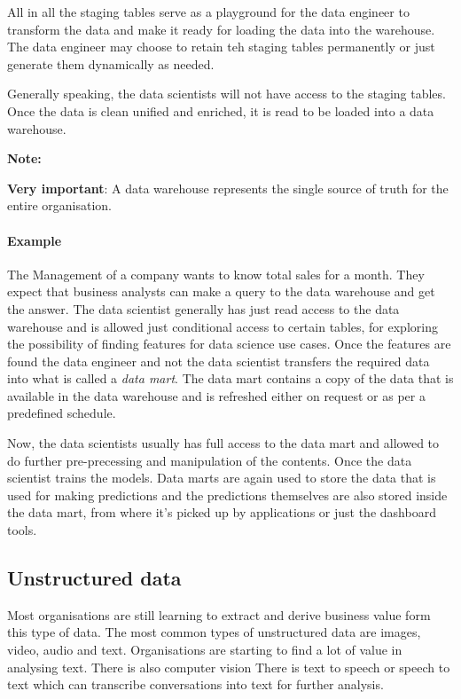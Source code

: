 \documentclass[a4paper, 11pt]{article}
\newenvironment{note}{
    \begin{siderule}
        \textbf{Note: }
        }{
    \end{siderule}}
\begin{document}
    All in all the staging tables serve as a playground for the data engineer to transform the data and make it ready for loading the data into the warehouse.
    The data engineer may choose to retain teh staging tables permanently or just generate them dynamically as needed.

    Generally speaking, the data scientists will not have access to the staging tables.
    Once the data is clean unified and enriched, it is read to be loaded into a data warehouse.

    \begin{note}
        \textbf{Very important}: A data warehouse represents the single source of truth for the entire organisation.
    \end{note}

    \paragraph{Example}
    The Management of a company wants to know total sales for a month.
    They expect that business analysts can make a query to the data warehouse and get the answer.
    The data scientist generally has just read access to the data warehouse and is allowed just conditional access to certain tables, for exploring the possibility of finding features for data science use cases.
    Once the features are found the data engineer and not the data scientist transfers the required data into what is called a \textit{data mart}.
    The data mart contains a copy of the data that is available in the data warehouse and is refreshed either on request or as per a predefined schedule.

    Now, the data scientists usually has full access to the data mart and allowed to do further pre-precessing and manipulation of the contents.
    Once the data scientist trains the models.
    Data marts are again used to store the data that is used for making predictions and the predictions themselves are also stored inside the data mart, from where it's picked up by applications or just the dashboard tools.

    \subsection{Unstructured data}
    Most organisations are still learning to extract and derive business value form this type of data.
    The most common types of unstructured data are images, video, audio and text.
    Organisations are starting to find a lot of value in analysing text.
    There is also computer vision
    There is text to speech or speech to text which can transcribe conversations into text for further analysis.
\end{document}

